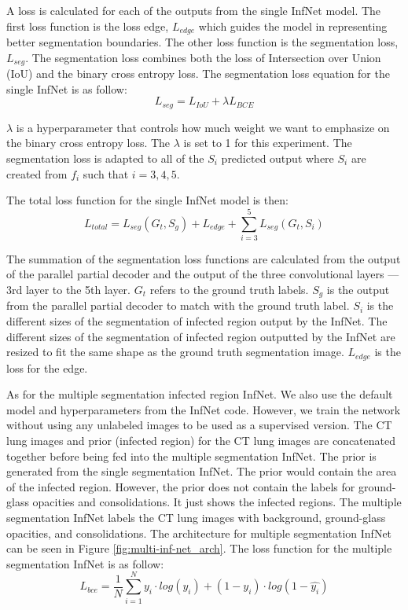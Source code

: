  A loss is calculated for each of the outputs from the single InfNet model. The first loss function is the loss edge, $L_{edge}$ which guides the model in representing better segmentation boundaries. The other loss function is the segmentation loss, ${L_{seg}}$. The segmentation loss combines both the loss of Intersection over Union (IoU) and the binary cross entropy loss. The segmentation loss equation for the single InfNet is as follow:
\begin{equation}
L_{seg} = L_{IoU} + \lambda L_{BCE}
\end{equation}

$\lambda$ is a hyperparameter that controls how much weight we want to emphasize on the binary cross entropy loss. The $\lambda$ is set to 1 for this experiment. The segmentation loss is adapted to all of the ${S_i}$ predicted output where ${S_i}$ are created from $f_i$ such that $i={3,4,5}$. 

The total loss function for the single InfNet model is then:
\begin{equation}
L_{total} = L_{seg}(G_t, S_g) + L_{edge} + 	\sum_{i=3}^{5}L_{seg}(G_t, S_i)
\end{equation}

The summation of the segmentation loss functions are calculated from the output of the parallel partial decoder and the output of the three convolutional layers --- 3rd layer to the 5th layer. $G_t$ refers to the ground truth labels. $S_g$ is the output from the parallel partial decoder to match with the ground truth label. $S_i$ is the different sizes of the segmentation of infected region output by the InfNet. The different sizes of the segmentation of infected region outputted by the InfNet are resized to fit the same shape as the ground truth segmentation image. $L_{edge}$ is the loss for the edge. 

As for the multiple segmentation infected region InfNet. We also use the default model and hyperparameters from the InfNet code. However, we train the network without using any unlabeled images to be used as a supervised version. The CT lung images and prior (infected region) for the CT lung images are concatenated together before being fed into the multiple segmentation InfNet. The prior is generated from the single segmentation InfNet. The prior would contain the area of the infected region. However, the prior does not contain the labels for ground-glass opacities and consolidations. It just shows the infected regions. The multiple segmentation InfNet labels the CT lung images with background, ground-glass opacities, and consolidations. The architecture for multiple segmentation InfNet can be seen in Figure \ref{fig:multi-inf-net_arch}. The loss function for the multiple segmentation InfNet is as follow:
\begin{equation}
L_{bce} = \frac{1}{N}\sum_{i=1}^{N} y_i \cdot log(\hat{y_i}) + (1-y_i)\cdot log(1-\hat{y_i})
\end{equation}

